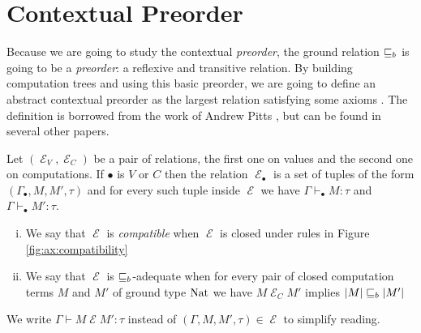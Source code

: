 \section{Contextual Preorder}

Because we are going to study the contextual \emph{preorder},
the ground relation $\sqsubseteq_b$ is going to be a \emph{preorder}: a reflexive 
and transitive relation. By building computation trees and using this basic 
preorder, we are going to define an abstract contextual preorder 
as the largest relation satisfying some axioms \cite{gom} \cite{Ugo2017}.
The definition is borrowed from the work of Andrew Pitts \cite{Pitts2000}, but can be
found in several other papers.

\newcommand{\CE}{\operatorname{\mathcal{E}}}

\begin{definition}
    Let $(\CE_V,\CE_C)$ be a pair of relations, the first 
    one on values and the second one on computations.
    If $\bullet$ is $V$ or $C$ then the relation 
    $\CE_\bullet$ is a set of tuples of the form $(\Gamma_\bullet, M,M', \tau)$
    and for every such tuple inside $\CE$ we have 
    $\Gamma \vdash_\bullet M : \tau$ and $\Gamma \vdash_\bullet M' : \tau$. 

    \begin{enumerate}[(i)]
        \item We say that $\CE$ is \emph{compatible} when
            $\CE$ is closed under rules in Figure
            \ref{fig:ax:compatibility}

        \item We say that $\CE$ is $\sqsubseteq_b$-adequate 
            when for every pair of closed computation 
            terms $M$ and $M'$
            of ground type $\textnormal{Nat}$ we have $M \CE_C M'$ 
            implies $|M| \sqsubseteq_b |M'|$
    \end{enumerate}

    We write $\Gamma \vdash M \CE M' : \tau$ 
    instead of $(\Gamma, M, M', \tau) \in \CE$ 
    to simplify reading.
\end{definition}

